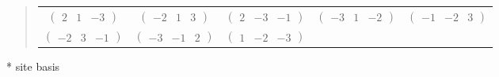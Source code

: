 \documentclass[fleqn,9pt,landscape]{jsarticle}
\begin{document}
\begin{quote}
\begin{tabular}{ccccc}
$ \begin{pmatrix} 2 & 1 & -3 \end{pmatrix} $ & $ \begin{pmatrix} -2 & 1 & 3 \end{pmatrix} $ & $ \begin{pmatrix} 2 & -3 & -1 \end{pmatrix} $ & $ \begin{pmatrix} -3 & 1 & -2 \end{pmatrix} $ & $ \begin{pmatrix} -1 & -2 & 3 \end{pmatrix} $ \\
$ \begin{pmatrix} -2 & 3 & -1 \end{pmatrix} $ & $ \begin{pmatrix} -3 & -1 & 2 \end{pmatrix} $ & $ \begin{pmatrix} 1 & -2 & -3 \end{pmatrix} $ & $  $ & $  $
\end{tabular}
\end{quote}
* site basis
\end{document}
